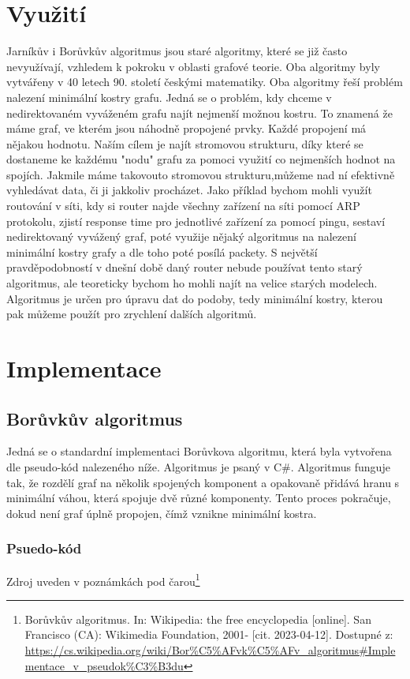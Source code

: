 \documentclass[11pt]{article}
\begin{document}
\section{Využití}
Jarníkův i Borůvkův algoritmus jsou staré algoritmy, které se již často nevyužívají, vzhledem k pokroku v oblasti grafové teorie. Oba algoritmy byly vytvářeny v 40 letech 90. století českými matematiky. Oba algoritmy řeší problém nalezení minimální kostry grafu. Jedná se o problém, kdy chceme v nedirektovaném vyváženém grafu najít nejmenší možnou kostru. To znamená že máme graf, ve kterém jsou náhodně propojené prvky. Každé propojení má nějakou hodnotu. Naším cílem je najít stromovou strukturu, díky které se dostaneme ke každému "nodu" grafu za pomoci využití co nejmenších hodnot na spojích. Jakmile máme takovouto stromovou strukturu,můžeme nad ní efektivně vyhledávat data, či ji jakkoliv procházet. Jako příklad bychom mohli využít routování v síti, kdy si router najde všechny zařízení na síti pomocí ARP protokolu, zjistí response time pro jednotlivé zařízení za pomocí pingu, sestaví nedirektovaný vyvážený graf, poté využije nějaký algoritmus na nalezení minimální kostry grafy a dle toho poté posílá packety. S největší pravděpodobností v dnešní době daný router nebude používat tento starý algoritmus, ale teoreticky bychom ho mohli najít na velice starých modelech. Algoritmus je určen pro úpravu dat do podoby, tedy minimální kostry, kterou pak můžeme použít pro zrychlení dalších algoritmů.

\pagebreak

\section{Implementace}

\subsection{Borůvkův algoritmus}
Jedná se o standardní implementaci Borůvkova algoritmu, která byla vytvořena dle pseudo-kód nalezeného níže. Algoritmus je psaný v C\#.
Algoritmus funguje tak, že rozdělí graf na několik spojených komponent a opakovaně přidává hranu s minimální váhou, která spojuje dvě různé komponenty. Tento proces pokračuje, dokud není graf úplně propojen, čímž vznikne minimální kostra.

\subsubsection{Psuedo-kód}
Zdroj uveden v poznámkách pod čarou\footnote{Borůvkův algoritmus. In: Wikipedia: the free encyclopedia [online]. San Francisco (CA): Wikimedia Foundation, 2001- [cit. 2023-04-12]. Dostupné z: \url{https://cs.wikipedia.org/wiki/Bor\%C5\%AFvk\%C5\%AFv_algoritmus\#Implementace_v_pseudok\%C3\%B3du}}
\end{document}
